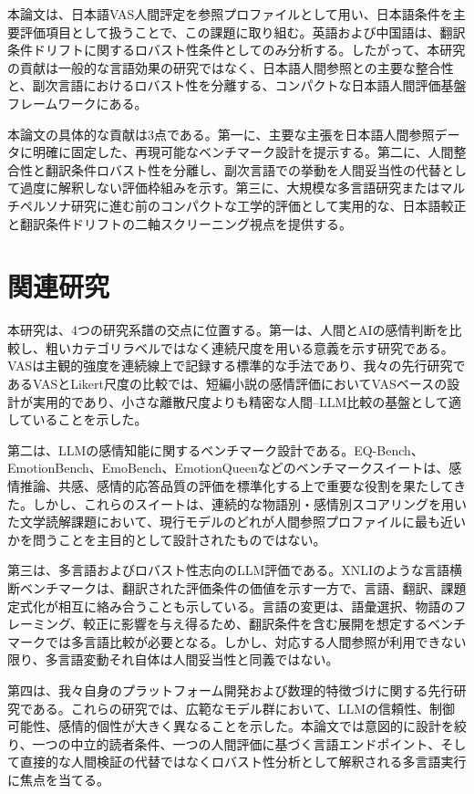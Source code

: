 \documentclass[lualatex,ja=standard,a4paper,11pt]{bxjsarticle}
\begin{document}
本論文は、日本語VAS人間評定を参照プロファイルとして用い、日本語条件を主要評価項目として扱うことで、この課題に取り組む。英語および中国語は、翻訳条件ドリフトに関するロバスト性条件としてのみ分析する。したがって、本研究の貢献は一般的な言語効果の研究ではなく、日本語人間参照との主要な整合性と、副次言語におけるロバスト性を分離する、コンパクトな日本語人間評価基盤フレームワークにある。

本論文の具体的な貢献は3点である。第一に、主要な主張を日本語人間参照データに明確に固定した、再現可能なベンチマーク設計を提示する。第二に、人間整合性と翻訳条件ロバスト性を分離し、副次言語での挙動を人間妥当性の代替として過度に解釈しない評価枠組みを示す。第三に、大規模な多言語研究またはマルチペルソナ研究に進む前のコンパクトな工学的評価として実用的な、日本語較正と翻訳条件ドリフトの二軸スクリーニング視点を提供する。

\section{関連研究}

本研究は、4つの研究系譜の交点に位置する。第一は、人間とAIの感情判断を比較し、粗いカテゴリラベルではなく連続尺度を用いる意義を示す研究である。VASは主観的強度を連続線上で記録する標準的な手法であり\cite{aitken1969vas}、我々の先行研究であるVASとLikert尺度の比較では、短編小説の感情評価においてVASベースの設計が実用的であり、小さな離散尺度よりも精密な人間--LLM比較の基盤として適していることを示した\cite{shirahama2025vas}。

第二は、LLMの感情知能に関するベンチマーク設計である。EQ-Bench、EmotionBench、EmoBench、EmotionQueenなどのベンチマークスイートは、感情推論、共感、感情的応答品質の評価を標準化する上で重要な役割を果たしてきた\cite{paech2024eqbench,huang2024emotionbench,sabour2024emobench,chen2024emotionqueen}。しかし、これらのスイートは、連続的な物語別・感情別スコアリングを用いた文学読解課題において、現行モデルのどれが人間参照プロファイルに最も近いかを問うことを主目的として設計されたものではない。

第三は、多言語およびロバスト性志向のLLM評価である。XNLIのような言語横断ベンチマークは、翻訳された評価条件の価値を示す一方で、言語、翻訳、課題定式化が相互に絡み合うことも示している\cite{conneau2018xnli}。言語の変更は、語彙選択、物語のフレーミング、較正に影響を与え得るため、翻訳条件を含む展開を想定するベンチマークでは多言語比較が必要となる。しかし、対応する人間参照が利用できない限り、多言語変動それ自体は人間妥当性と同義ではない。

第四は、我々自身のプラットフォーム開発および数理的特徴づけに関する先行研究である。これらの研究では、広範なモデル群において、LLMの信頼性、制御可能性、感情的個性が大きく異なることを示した\cite{openrouterplatform,shirahama2026mdpi}。本論文では意図的に設計を絞り、一つの中立的読者条件、一つの人間評価に基づく言語エンドポイント、そして直接的な人間検証の代替ではなくロバスト性分析として解釈される多言語実行に焦点を当てる。
\end{document}
